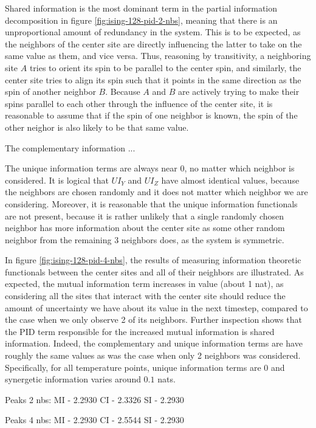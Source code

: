 \documentclass[12pt]{article}
\begin{document}
Shared information is the most dominant term in the partial information decomposition in figure \ref{fig:ising-128-pid-2-nbs}, meaning that there is an unproportional amount of redundancy in the system. This is to be expected, as the neighbors of the center site are directly influencing the latter to take on the same value as them, and vice versa. Thus, reasoning by transitivity, a neighboring site $A$ tries to orient its spin to be parallel to the center spin, and similarly, the center site tries to align its spin such that it points in the same direction as the spin of another neighbor $B$. Because $A$ and $B$ are actively trying to make their spins parallel to each other through the influence of the center site, it is reasonable to assume that if the spin of one neighbor is known, the spin of the other neighor is also likely to be that same value. 

The complementary information ...  

The unique information terms are always near 0, no matter which neighbor is considered. It is logical that $UI_Y$ and $UI_Z$ have almost identical values, because the neighbors are chosen randomly and it does not matter which neighbor we are considering. Moreover, it is reasonable that the unique information functionals are not present, because it is rather unlikely that a single randomly chosen neighbor has more information about the center site as some other random neighbor from the remaining 3 neighbors does, as the system is symmetric.

In figure \ref{fig:ising-128-pid-4-nbs}, the results of measuring information theoretic functionals between the center sites and all of their neighbors are illustrated. As expected, the mutual information term increases in value (about 1 nat), as considering all the sites that interact with the center site should reduce the amount of uncertainty we have about its value in the next timestep, compared to the case when we only observe 2 of its neighbors. Further inspection shows that the PID term responsible for the increased mutual information is shared information. Indeed, the complementary and unique information terms are have roughly the same values as was the case when only 2 neighbors was considered. Specifically, for all temperature points, unique information terms are $0$ and synergetic information varies around $0.1$ nats. 

Peaks 2 nbs:
MI - 2.2930
CI - 2.3326
SI - 2.2930

Peaks 4 nbs:
MI - 2.2930
CI - 2.5544
SI - 2.2930
\end{document}
